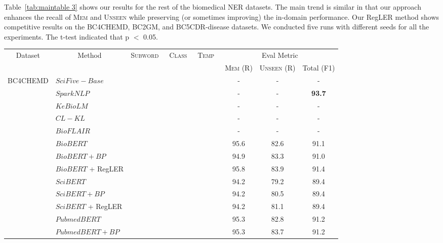 \documentclass[11pt]{article}
\newcommand{\cmark}{\ding{51}}\newcommand{\xmark}{\ding{55}}\newcommand{\cross}{\ding{61}}\newcommand{\mb}[1]{\textcolor{red}{#1}}
\begin{document}
Table~\ref{tab:maintable 3} shows our results for the rest of the biomedical NER datasets.
The main trend is similar in that our approach enhances the recall of \textsc{Mem} and \textsc{Unseen} while preserving (or sometimes improving) the in-domain performance.
Our RegLER method shows competitive results on the BC4CHEMD, BC2GM, and BC5CDR-disease datasets.
We conducted five runs with different seeds for all the experiments. The t-test indicated that p $<$ 0.05.

\begin{table*}[t]
\centering
\begin{adjustbox}{width=0.75\textwidth}
\begin{tabular}{ l l c c c c c c }
\toprule
\multicolumn{1}{c}{\multirow{2}{*}{Dataset}} & \multicolumn{1}{c}{\multirow{2}{*}{Method}} & \multicolumn{1}{c}{\multirow{2}{*}{\textsc{Subword}~}} & \multicolumn{1}{c}{\multirow{2}{*}{\textsc{Class}~}} &
\multicolumn{1}{c}{\multirow{2}{*}{\textsc{Temp}~}} & \multicolumn{3}{c}{Eval Metric}       \\ \cmidrule{6-8} 
\multicolumn{1}{c}{} & & & & & 
\textsc{Mem} (R) & 
\textsc{Unseen} (R) & 
Total (F1) \\ \midrule
\multirow{21}{*}{BC4CHEMD}                   
& $SciFive-Base$ & \xmark & \xmark & \xmark & - & - & - \\
& $SparkNLP$ & \xmark & \xmark & \xmark & - & - & \textbf{93.7} \\
& $KeBioLM$ & \xmark & \xmark & \xmark & - & - & -  \\
& $CL - KL$ & \xmark & \xmark & \xmark & - & - & -  \\
& $BioFLAIR$ & \xmark & \xmark & \xmark & - & - & - \\
\cmidrule{2-8}
& $BioBERT$ & \xmark & \xmark & \xmark & 95.6 & 82.6 & 91.1 \\
& $BioBERT + {BP}$ & \xmark & \xmark & \xmark & 94.9 & 83.3 & 91.0 \\
& $BioBERT$ + RegLER & \cmark & \cmark & \cmark & 95.8 & 83.9 & 91.4 \\
\cmidrule{2-8}
& $SciBERT$ & \xmark & \xmark & \xmark & 94.2 & 79.2 & 89.4 \\
& $SciBERT + {BP}$ & \xmark & \xmark & \xmark & 94.2 & 80.5 & 89.4 \\
& $SciBERT$ + RegLER & \cmark & \cmark & \cmark & 94.2 & 81.1 & 89.4 \\
\cmidrule{2-8}
& $PubmedBERT$ & \xmark & \xmark & \xmark & 95.3 & 82.8 & 91.2 \\
& $PubmedBERT + {BP}$ & \xmark & \xmark & \xmark & 95.3 & 83.7 & 91.2 \\

\end{tabular}
\end{adjustbox}
\end{table*}
\end{document}
